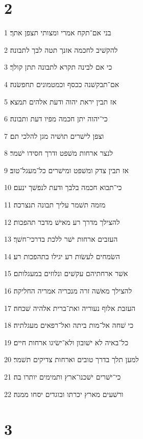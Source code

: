 \chapter{2}

\par 1 בני אם־תקח אמרי ומצותי תצפן אתך׃
\par 2 להקשׁיב לחכמה אזנך תטה לבך לתבונה׃
\par 3 כי אם לבינה תקרא לתבונה תתן קולך׃
\par 4 אם־תבקשׁנה ככסף וכמטמונים תחפשׂנה׃
\par 5 אז תבין יראת יהוה ודעת אלהים תמצא׃
\par 6 כי־יהוה יתן חכמה מפיו דעת ותבונה׃
\par 7 וצפן לישׁרים תושׁיה מגן להלכי תם׃
\par 8 לנצר ארחות משׁפט ודרך חסידו ישׁמר׃
\par 9 אז תבין צדק ומשׁפט ומישׁרים כל־מעגל־טוב׃
\par 10 כי־תבוא חכמה בלבך ודעת לנפשׁך ינעם׃
\par 11 מזמה תשׁמר עליך תבונה תנצרכה׃
\par 12 להצילך מדרך רע מאישׁ מדבר תהפכות׃
\par 13 העזבים ארחות ישׁר ללכת בדרכי־חשׁך׃
\par 14 השׂמחים לעשׂות רע יגילו בתהפכות רע׃
\par 15 אשׁר ארחתיהם עקשׁים ונלוזים במעגלותם׃
\par 16 להצילך מאשׁה זרה מנכריה אמריה החליקה׃
\par 17 העזבת אלוף נעוריה ואת־ברית אלהיה שׁכחה׃
\par 18 כי שׁחה אל־מות ביתה ואל־רפאים מעגלתיה׃
\par 19 כל־באיה לא ישׁובון ולא־ישׂיגו ארחות חיים׃
\par 20 למען תלך בדרך טובים וארחות צדיקים תשׁמר׃
\par 21 כי־ישׁרים ישׁכנו־ארץ ותמימים יותרו בה׃
\par 22 ורשׁעים מארץ יכרתו ובוגדים יסחו ממנה׃

\chapter{3}

